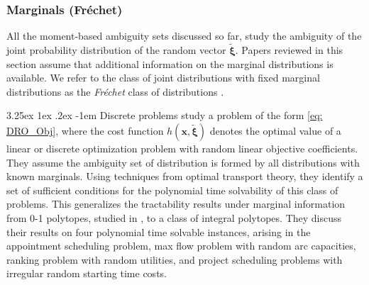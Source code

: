 \documentclass[final,onefignum,onetabnum]{class}
\makeatletter
\renewcommand\paragraph{\@startsection{paragraph}{4}{\z@}%
  {3.25ex \@plus1ex \@minus.2ex}%
  {-1em}%
  {\normalfont\normalsize\bfseries}}
\newcommand{\bs}[1]{\boldsymbol{#1}} %
\newcommand{\txi}{\tilde{\bs{\xi}}}
\makeatother
\begin{document}








\subsubsection{Marginals (Fr\'{e}chet)}

All the moment-based ambiguity sets discussed so far, study the ambiguity of the joint probability distribution of the random vector $\txi$. Papers reviewed in this section assume that additional information on the marginal distributions is available. We refer to the class of joint distributions with fixed marginal distributions
as the {\it Fr\'{e}chet} class of distributions \cite{doan2015robustness}. 

\paragraph{Discrete problems}
\citet{chen2018} study a problem of the form  \eqref{eq: DRO_Obj}, where the cost function $h(\bs{x},\txi)$ denotes the optimal value of a linear or discrete optimization problem with random linear objective coefficients. They assume the ambiguity set of distribution is formed by all distributions with known marginals. Using techniques from optimal transport theory, they identify a set of sufficient
conditions for the polynomial time solvability of this class of problems. This generalizes the  tractability results under marginal information from 0-1 polytopes, studied in \citet{bertsimas2004probabilistic},  to a class of integral polytopes. 
They discuss their results on  four  polynomial time
solvable instances, arising in the appointment scheduling problem, max flow problem with random arc capacities, ranking problem with random utilities, and project scheduling problems with irregular random starting time costs. 
\end{document}
